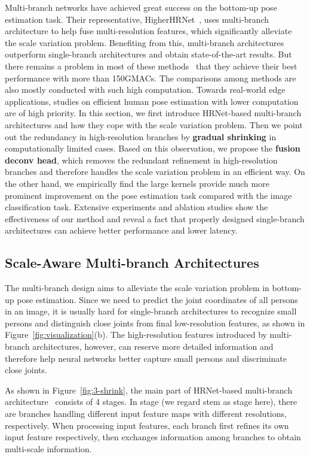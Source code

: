 \documentclass[10pt,twocolumn,letterpaper]{article}
\begin{document}
Multi-branch networks have achieved great success on the bottom-up pose estimation task. Their representative, HigherHRNet~\cite{cheng2020higherhrnet}, uses multi-branch architecture to help fuse multi-resolution features, which significantly alleviate the scale variation problem. Benefiting from this, multi-branch architectures outperform single-branch architectures and obtain state-of-the-art results. But there remains a problem in most of these methods~\cite{cheng2020higherhrnet,geng2021bottom,papandreou2018personlab,newell2016stacked} that they achieve their best performance with more than 150GMACs. The comparisons among methods are also mostly conducted with such high computation. Towards real-world edge applications, studies on efficient human pose estimation with lower computation are of high priority. In this section, we first introduce HRNet-based multi-branch architectures and how they cope with the scale variation problem. Then we point out the redundancy in high-resolution branches by \textbf{gradual shrinking} in computationally limited cases. Based on this observation, we propose the \textbf{fusion deconv head}, which removes the redundant refinement in high-resolution branches and therefore handles the scale variation problem in an efficient way. On the other hand, we empirically find the large kernels provide much more prominent improvement on the pose estimation task compared with the image classification task. Extensive experiments and ablation studies show the effectiveness of our method and reveal a fact that properly designed single-branch architectures can achieve better performance and lower latency. 

\subsection{Scale-Aware Multi-branch Architectures}

 The multi-branch design aims to alleviate the scale variation problem in bottom-up pose estimation. Since we need to predict the joint coordinates of all persons in an image, it is usually hard for single-branch architectures to recognize small persons and distinguish close joints from final low-resolution features, as shown in Figure~\ref{fig:visualization}(b). The high-resolution features introduced by multi-branch architectures, however, can reserve more detailed information and therefore help neural networks better capture small persons and discriminate close joints.

 As shown in Figure~\ref{fig:3-shrink}, the main part of HRNet-based multi-branch architecture~\cite{cheng2020higherhrnet,geng2021bottom} consists of 4 stages. In stage  (we regard stem as stage  here), there are  branches handling  different input feature maps with different resolutions, respectively. When processing input features, each branch first refines its own input feature respectively, then exchanges information among branches to obtain multi-scale information.
\end{document}
